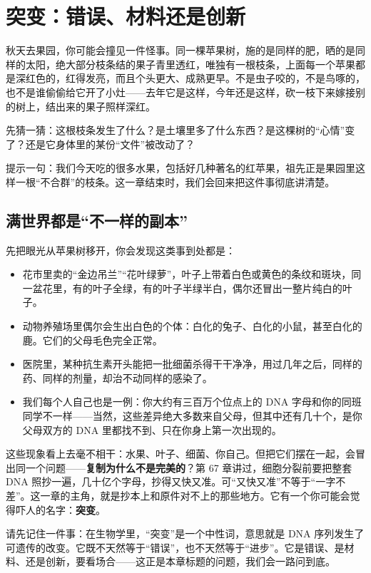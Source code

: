 \chapter{突变：错误、材料还是创新}

\begin{kaichang}
秋天去果园，你可能会撞见一件怪事。同一棵苹果树，施的是同样的肥，晒的是同样的太阳，绝大部分枝条结的果子青里透红，唯独有一根枝条，上面每一个苹果都是深红色的，红得发亮，而且个头更大、成熟更早。不是虫子咬的，不是鸟啄的，也不是谁偷偷给它开了小灶——去年它是这样，今年还是这样，砍一枝下来嫁接别的树上，结出来的果子照样深红。

先猜一猜：这根枝条发生了什么？是土壤里多了什么东西？是这棵树的“心情”变了？还是它身体里的某份“文件”被改动了？

提示一句：我们今天吃的很多水果，包括好几种著名的红苹果，祖先正是果园里这样一根“不合群”的枝条。这一章结束时，我们会回来把这件事彻底讲清楚。
\end{kaichang}

\section{满世界都是“不一样的副本”}

先把眼光从苹果树移开，你会发现这类事到处都是：

\begin{itemize}[itemsep=2pt]
\item 花市里卖的“金边吊兰”“花叶绿萝”，叶子上带着白色或黄色的条纹和斑块，同一盆花里，有的叶子全绿，有的叶子半绿半白，偶尔还冒出一整片纯白的叶子。
\item 动物养殖场里偶尔会生出白色的个体：白化的兔子、白化的小鼠，甚至白化的鹿。它们的父母毛色完全正常。
\item 医院里，某种抗生素开头能把一批细菌杀得干干净净，用过几年之后，同样的药、同样的剂量，却治不动同样的感染了。
\item 我们每个人自己也是一例：你大约有三百万个位点上的 DNA 字母和你的同班同学不一样——当然，这些差异绝大多数来自父母，但其中还有几十个，是你父母双方的 DNA 里都找不到、只在你身上第一次出现的。
\end{itemize}

这些现象看上去毫不相干：水果、叶子、细菌、你自己。但把它们摆在一起，会冒出同一个问题——\textbf{复制为什么不是完美的}？第 67 章讲过，细胞分裂前要把整套 DNA 照抄一遍，几十亿个字母，抄得又快又准。可“又快又准”不等于“一字不差”。这一章的主角，就是抄本上和原件对不上的那些地方。它有一个你可能会觉得吓人的名字：\textbf{突变}。

请先记住一件事：在生物学里，“突变”是一个中性词，意思就是 DNA 序列发生了可遗传的改变。它既不天然等于“错误”，也不天然等于“进步”。它是错误、是材料、还是创新，要看场合——这正是本章标题的问题，我们会一路问到底。

